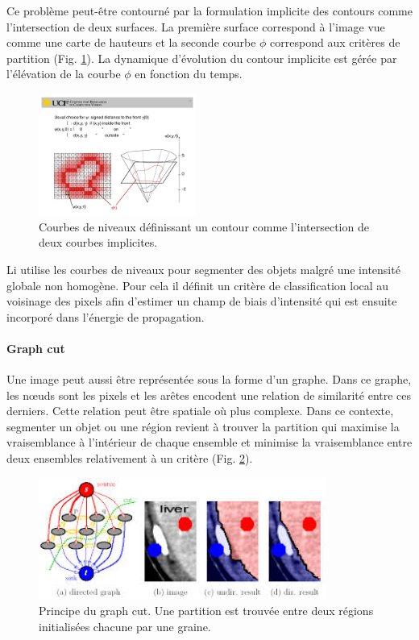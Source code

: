       Ce problème peut-être contourné par la formulation implicite des contours comme l'intersection de deux surfaces. La première surface correspond à l'image vue comme une carte de hauteurs et la seconde courbe $\phi$ correspond aux critères de partition (Fig. \ref{fig:level_set}). La dynamique d'évolution du contour implicite est gérée par l'élévation de la courbe $\phi$ en fonction du temps. 

      \begin{figure}[h]
        \centering
        \includegraphics[height=4cm]{Images/level_set_active_contour.jpeg}
        \caption{Courbes de niveaux définissant un contour comme l'intersection de deux courbes implicites.}
        \label{fig:level_set}
      \end{figure}

      Li \cite{Li2011_mri_level_set} utilise les courbes de niveaux pour segmenter des objets malgré une intensité globale non homogène. Pour cela il définit un critère de classification local au voisinage des pixels afin d'estimer un champ de biais d'intensité qui est ensuite incorporé dans l'énergie de propagation.

      \paragraph{Graph cut}

      Une image peut aussi être représentée sous la forme d'un graphe. Dans ce graphe, les nœuds sont les pixels et les arêtes encodent une relation de similarité entre ces derniers. Cette relation peut être spatiale où plus complexe. Dans ce contexte, segmenter un objet ou une région revient à trouver la partition qui maximise la vraisemblance à l'intérieur de chaque ensemble et minimise la vraisemblance entre deux ensembles relativement à un critère (Fig. \ref{fig:graph_cut}).

      \begin{figure}[h]
        \centering
        \includegraphics[height=4cm]{Images/graph_cut.jpeg}
        \caption{Principe du graph cut. Une partition est trouvée entre deux régions initialisées chacune par une graine.}
        \label{fig:graph_cut}
      \end{figure}

